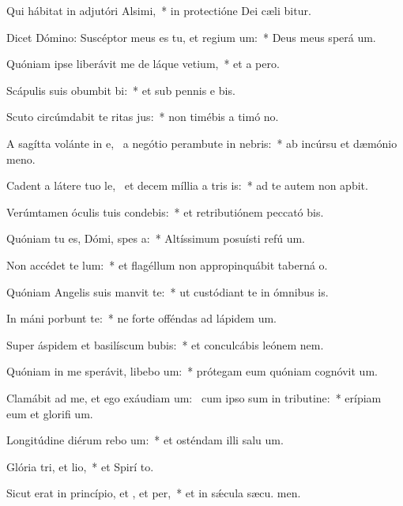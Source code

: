\item Qui hábitat in adjutóri Alsimi,~* in protectióne Dei cæli bitur.
\item Dicet Dómino: Suscéptor meus es tu, et regium um:~* Deus meus sperá  um.
\item Quóniam ipse liberávit me de láque vetium,~* et a  pero.
\item Scápulis suis obumbit bi:~* et sub pennis e bis.
\item Scuto circúmdabit te ritas jus:~* non timébis a timó no.
\item A sagítta volánte in e,~\pscross{} a negótio perambute in nebris:~* ab incúrsu et dæmónio meno.
\item Cadent a látere tuo le,~\pscross{} et decem míllia a tris is:~* ad te autem non apbit.
\item Verúmtamen óculis tuis condebis:~* et retributiónem peccató bis.
\item Quóniam tu es, Dómi, spes a:~* Altíssimum posuísti refú um.
\item Non accédet  te lum:~* et flagéllum non appropinquábit taberná o.
\item Quóniam Angelis suis manvit  te:~* ut custódiant te in ómnibus  is.
\item In máni porbunt te:~* ne forte offéndas ad lápidem  um.
\item Super áspidem et basilíscum bubis:~* et conculcábis leónem  nem.
\item Quóniam in me sperávit, libebo um:~* prótegam eum quóniam cognóvit  um.
\item Clamábit ad me, et ego exáudiam um:~\pscross{} cum ipso sum in tributine:~* erípiam eum et glorifi um.
\item Longitúdine diérum rebo um:~* et osténdam illi salu um.
\item Glória tri, et lio,~* et Spirí to.
\item Sicut erat in princípio, et , et per,~* et in sǽcula sæcu. men.
